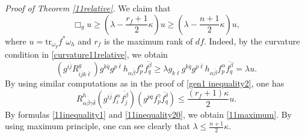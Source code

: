\documentclass[12pt]{amsart}
\theoremstyle{plain}
\theoremstyle{definition}
\renewcommand{\bar}{\overline}
\newcommand{\beq}{\begin{equation}}
\newcommand{\eeq}{\end{equation}}
\renewcommand{\>}{\rightarrow}
\numberwithin{equation}{section} %
\begin{document}
\baselineskip



\noindent\emph{Proof of Theorem \ref{11relative}.}
We claim that \beq \Box_g u \geq \left(\lambda-  \frac{r_f+1}{2}\kappa\right)u \geq   \left(\lambda-\frac{n+1}{2}\kappa\right) u,\label{11maximum}\eeq
where $u=\mbox{tr}_{\omega_g} f^*\omega_h$ and $r_f$ is the maximum rank of $df$.  Indeed,
by  the curvature condition in \eqref{curvature11relative}, we obtain
\beq	
\left(g^{i\bar j} R^g_{i\bar j k\bar \ell} \right)g^{k\bar q} g^{p\bar \ell} h_{\alpha\bar\beta} f^{\alpha }_p \bar{f^\beta_q}
\geq \lambda  g_{k\bar\ell}g^{k\bar q} g^{p\bar \ell} h_{\alpha\bar\beta} f^{\alpha }_p \bar{f^\beta_q}= \lambda u. 
\label{11inequality1} 
\eeq
By using similar computations as in the proof of \eqref{gen1 inequality2}, one has 
\beq R^h_{\alpha\bar\beta\gamma\bar\delta}\left(g^{i\bar j} f^{\alpha}_i \bar{f^{\beta}_j} \right)  \left(g^{p\bar q}  f^\gamma_p \bar{f^\delta_q} \right)\leq \frac{\left(r_f+1\right)\kappa}{2}u.\label{11inequality20}\eeq 
By  formulas \eqref{11inequality1} and \eqref{11inequality20},  we obtain
\eqref{11maximum}.
By using maximum principle, one can see clearly that $\lambda\le \frac{n+1}{2}\kappa$.\\
\end{document}
